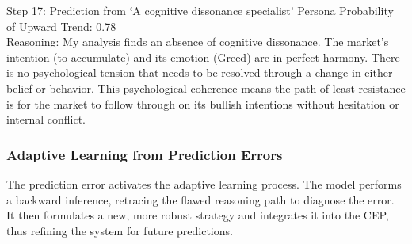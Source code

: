 \documentclass[letterpaper]{article} %
\begin{document}
\begin{actionBox}{Step 17: Prediction from `A cognitive dissonance specialist' Persona}
    Probability of Upward Trend: 0.78 \\
    Reasoning: My analysis finds an absence of cognitive dissonance. The market's intention (to accumulate) and its emotion (Greed) are in perfect harmony. There is no psychological tension that needs to be resolved through a change in either belief or behavior. This psychological coherence means the path of least resistance is for the market to follow through on its bullish intentions without hesitation or internal conflict.
\end{actionBox}

\subsubsection{Adaptive Learning from Prediction Errors}
The prediction error activates the adaptive learning process. The model performs a backward inference, retracing the flawed reasoning path to diagnose the error. It then formulates a new, more robust strategy and integrates it into the CEP, thus refining the system for future predictions.
\end{document}

